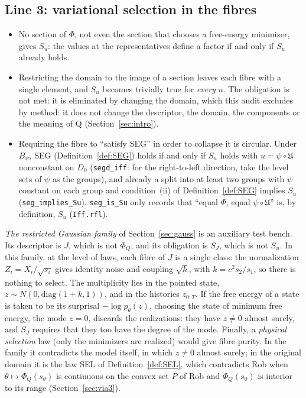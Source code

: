 \subsection{Line 3: variational selection in the fibres}\label{sec:l3}
\begin{theorem}\label{thm:selection}
\begin{itemize}
\item[(a)] No section of $\Phi$, not even the section that chooses a free-energy minimizer, gives $S_u$: the values at the representatives define a factor if and only if $S_u$ already holds.
\item[(b)] Restricting the domain to the image of a section leaves each fibre with a single element, and $S_u$ becomes trivially true for \emph{every} $u$. The obligation is not met: it is eliminated by changing the domain, which this audit excludes by method: it does not change the descriptor, the domain, the components or the meaning of Q (Section~\ref{sec:intro}).
\item[(c)] Requiring the fibre to ``satisfy SEG'' in order to collapse it is circular. Under $B_\psi$, SEG (Definition~\ref{def:SEG}) holds if and only if $S_u$ holds with $u=\psi\circ\mathfrak U$ nonconstant on $D_0$ (\texttt{segd\_iff}: for the right-to-left direction, take the level sets of $\psi$ as the groups), and already a split into at least two groups with $\psi$ constant on each group and condition~(ii) of Definition~\ref{def:SEG} implies $S_u$ (\texttt{seg\_implies\_Su}). \texttt{seg\_is\_Su} only records that ``equal $\Phi$, equal $\psi\circ\mathfrak U$'' is, by definition, $S_u$ (\texttt{Iff.rfl}).
\end{itemize}
\end{theorem}
\emph{The restricted Gaussian family} of Section~\ref{sec:gauss} is an auxiliary test bench. Its descriptor is $J$, which is not $\Phi_Q$, and its obligation is $S_J$, which is not $S_u$. In this family, at the level of laws, each fibre of $J$ is a single class: the normalization $Z_i=X_i/\sqrt{s_i}$ gives identity noise and coupling $\sqrt k$, with $k=c^2s_2/s_1$, so there is nothing to select. The multiplicity lies in the pointed state, $z\sim N(0,\mathrm{diag}(1+k,1))$, and in the histories $z_{0:T}$. If the free energy of a state is taken to be its surprisal $-\log p_\theta(z)$, choosing the state of minimum free energy, the mode $z=0$, discards the realizations: they have $z\ne0$ almost surely, and $S_J$ requires that they too have the degree of the mode. Finally, a \emph{physical selection} law (only the minimizers are realized) would give fibre purity. In the family it contradicts the model itself, in which $z\ne0$ almost surely; in the original domain it is the law SEL of Definition~\ref{def:SEL}, which contradicts Rob when $\theta\mapsto\Phi_Q(s_\theta)$ is continuous on the convex set $P$ of Rob and $\Phi_Q(s_0)$ is interior to its range (Section~\ref{sec:via3}).

